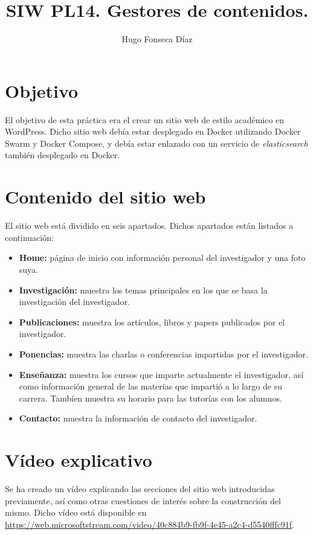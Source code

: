 \documentclass[11pt]{article}
\begin{document}
\title{SIW PL14. Gestores de contenidos.}
\author{Hugo Fonseca Díaz\\ }
\maketitle
\section{Objetivo}
El objetivo de esta práctica era el crear un sitio web de estilo académico en WordPress. Dicho sitio web debía estar desplegado en Docker utilizando Docker Swarm y Docker Compose, y debía estar enlazado con un servicio de \textit{elasticsearch} también desplegado en Docker.
\section{Contenido del sitio web}
El sitio web está dividido en seis apartados. Dichos apartados están listados a continuación:
\begin{itemize}
    \item \textbf{Home:} página de inicio con información personal del investigador y una foto suya. 
    \item \textbf{Investigación:} muestra los temas principales en los que se basa la investigación del investigador. 
    \item \textbf{Publicaciones:} muestra los artículos, libros y papers publicados por el investigador. 
    \item \textbf{Ponencias:} muestra las charlas o conferencias impartidas por el investigador. 
    \item \textbf{Enseñanza:} muestra los cursos que imparte actualmente el investigador, así como información general de las materias que impartió a lo largo de su carrera. Tambíen muestra su horario para las tutorías con los alumnos.  
    \item \textbf{Contacto:} muestra la información de contacto del investigador.  
\end{itemize}
\section{Vídeo explicativo}
Se ha creado un vídeo explicando las secciones del sitio web introducidas previamente, así como otras cuestiones de interés sobre la construcción del mismo. Dicho vídeo está disponible en \url{https://web.microsoftstream.com/video/40c884b9-fb9f-4e45-a2c4-d5540fffc91f}.
\end{document}
